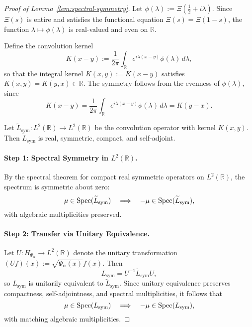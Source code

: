 \begin{proof}[Proof of Lemma~\ref{lem:spectral-symmetry}]
Let \( \phi(\lambda) := \Xi\left(\tfrac{1}{2} + i\lambda\right) \). Since \( \Xi(s) \) is entire and satisfies the functional equation \( \Xi(s) = \Xi(1 - s) \), the function \( \lambda \mapsto \phi(\lambda) \) is real-valued and even on \( \mathbb{R} \).

Define the convolution kernel
\[
K(x - y) := \frac{1}{2\pi} \int_{\mathbb{R}} e^{i\lambda(x - y)} \phi(\lambda)\, d\lambda,
\]
so that the integral kernel \( K(x,y) := K(x - y) \) satisfies \( K(x,y) = K(y,x) \in \mathbb{R} \). The symmetry follows from the evenness of \( \phi(\lambda) \), since
\[
K(x - y) = \frac{1}{2\pi} \int_{\mathbb{R}} e^{i\lambda(x - y)} \phi(\lambda)\, d\lambda = K(y - x).
\]

Let \( \widetilde{L}_{\mathrm{sym}} \colon L^2(\mathbb{R}) \to L^2(\mathbb{R}) \) be the convolution operator with kernel \( K(x,y) \). Then \( \widetilde{L}_{\mathrm{sym}} \) is real, symmetric, compact, and self-adjoint.

\paragraph{Step 1: Spectral Symmetry in \( L^2(\mathbb{R}) \).}
By the spectral theorem for compact real symmetric operators on \( L^2(\mathbb{R}) \), the spectrum is symmetric about zero:
\[
\mu \in \operatorname{Spec}(\widetilde{L}_{\mathrm{sym}}) \quad \Longrightarrow \quad -\mu \in \operatorname{Spec}(\widetilde{L}_{\mathrm{sym}}),
\]
with algebraic multiplicities preserved.

\paragraph{Step 2: Transfer via Unitary Equivalence.}
Let \( U \colon H_{\Psi_\alpha} \to L^2(\mathbb{R}) \) denote the unitary transformation \( (Uf)(x) := \sqrt{\Psi_\alpha(x)} f(x) \). Then
\[
L_{\mathrm{sym}} = U^{-1} \widetilde{L}_{\mathrm{sym}} U,
\]
so \( L_{\mathrm{sym}} \) is unitarily equivalent to \( \widetilde{L}_{\mathrm{sym}} \). Since unitary equivalence preserves compactness, self-adjointness, and spectral multiplicities, it follows that
\[
\mu \in \operatorname{Spec}(L_{\mathrm{sym}}) \quad \Longrightarrow \quad -\mu \in \operatorname{Spec}(L_{\mathrm{sym}}),
\]
with matching algebraic multiplicities.
\end{proof}
%  
